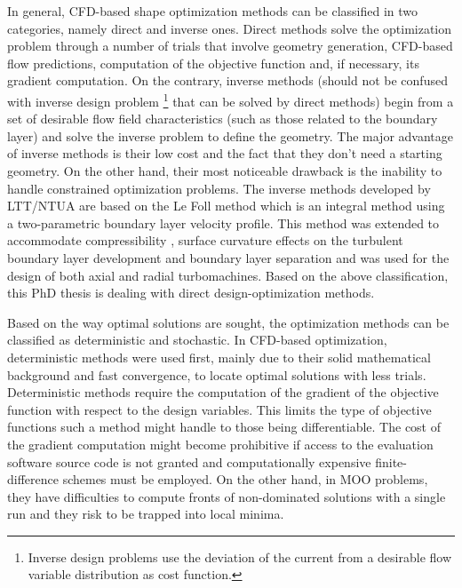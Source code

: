 In general, CFD-based shape optimization methods can be classified in two categories, namely direct and inverse ones. Direct methods \cite{phd_Giotis,phd_Kampolis,phd:papadim,kn:Emm2002,kn:Emm2004} solve the optimization problem through a number of trials that involve geometry generation, CFD-based flow predictions, computation of the objective function and, if necessary, its gradient computation.  On the contrary, inverse methods (should not be confused with inverse design problem \footnote{Inverse design problems use the deviation of the current from a desirable flow variable distribution as cost function.} that can be solved by direct methods) \cite{chav:95,ded:95} begin from a set of desirable flow field characteristics (such as those related to the boundary layer) and solve the inverse problem to define the geometry. The major advantage of inverse methods is their low cost and the fact that they don't need a starting geometry. On the other hand, their most noticeable drawback is the inability to handle constrained optimization problems. The inverse methods developed by LTT/NTUA are based on the Le Foll method \cite{lefoll} which is an integral method using a two-parametric boundary layer velocity profile. This method was extended to accommodate compressibility \cite{pap69}, surface curvature effects on the turbulent boundary layer development \cite{pap70} and boundary layer separation \cite{pap81} and was used for the design of both axial and radial turbomachines. Based on the above classification, this PhD thesis is dealing with direct design-optimization methods.  

Based on the way optimal solutions are sought, the optimization methods can be classified as deterministic and stochastic. In CFD-based optimization, deterministic methods were used first,  mainly due to their solid mathematical background and fast convergence, to locate optimal solutions with less trials. Deterministic methods require the computation of the gradient of the objective function with respect to the design variables. This limits the type of objective functions such a method might handle to those being differentiable. The cost of the gradient computation might become prohibitive if access to the evaluation software source code is not granted and computationally expensive finite-difference schemes must be employed. On the other hand, in MOO problems, they have difficulties to compute fronts of non-dominated solutions with a single run and they risk to be trapped into local minima.        

